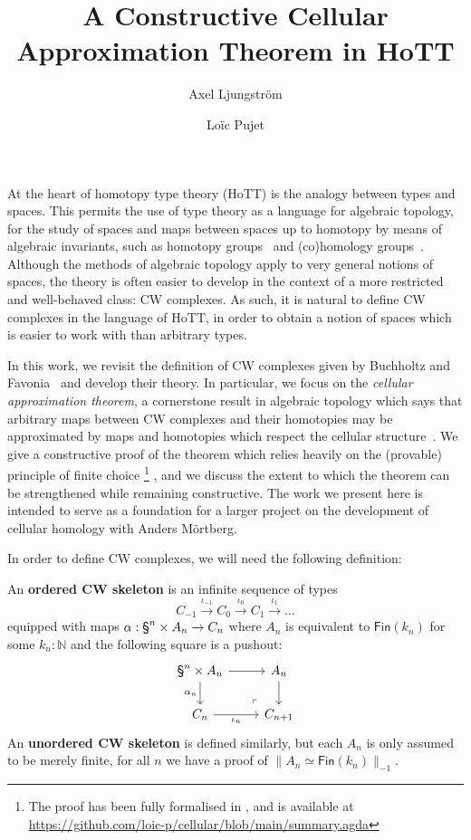 \documentclass{easychair}
\title{A Constructive Cellular Approximation Theorem in HoTT}
\author{
Axel Ljungström \and Loïc Pujet}
\institute{
  {
  Stockholm University,
  Stockholm, Sweden
  }
 }
\begin{document}
\maketitle

At the heart of homotopy type theory (HoTT) is the analogy between types and spaces.
%
This permits the use of type theory as a language for algebraic topology, \ie for the study
of spaces and maps between spaces up to homotopy by means of algebraic invariants, such as homotopy groups~\cite{HoTT13,Brunerie16,Buchholtz2016TheCC} and (co)homology groups~\cite{LicataFinster14,CavalloMsc15,BuchholtzFavonia18,graham18,BLM22,christensen2020hurewicz,LLM23,LM24}.
%
Although the methods of algebraic topology apply to very general notions of spaces, the theory is
often easier to develop in the context of a more restricted and well-behaved class:
CW complexes.
%
As such, it is natural to define CW complexes in the language of HoTT,
in order to obtain a notion of spaces which is easier to work with than arbitrary types.

In this work, we revisit the definition of CW complexes given by Buchholtz and
Favonia~\cite{BuchholtzFavonia18} and develop their theory.
%
In particular, we focus on the \emph{cellular approximation theorem}, a cornerstone result in
algebraic topology which says that arbitrary maps between CW complexes and their homotopies may be
approximated by maps and homotopies which respect the cellular structure~\cite[chap. 10]{May1999}.
%
We give a constructive proof of the theorem which relies heavily on the (provable) principle of
finite choice%
\footnote{The proof has been fully formalised in \CubicalAgda, and is available at \url{https://github.com/loic-p/cellular/blob/main/summary.agda}}%
, and we discuss the extent to which the theorem can be strengthened while remaining constructive.
%
The work we present here is intended to serve as a foundation for a larger
project on the development of cellular homology with Anders Mörtberg.

In order to define CW complexes, we will need the following definition:

\begin{definition}[CW skeleta]
  An \textbf{ordered CW skeleton} is an infinite sequence of types $$C_{-1} \xrightarrow{\iota_{-1}} C_0 \xrightarrow{\iota_{0}} C_1 \xrightarrow{\iota_{1}} \dots$$
  equipped with maps $\alpha : \sphere{n} \times A_n \to C_n$ where $A_n$ is equivalent to $\mathsf{Fin}(k_n)$ for some $k_n : \mathbb{N}$ and the following square is a pushout:
  \[
\begin{tikzcd}[ampersand replacement=\&]
	{\sphere{n} \times A_n} \& {A_n} \\
	{C_n} \& {C_{n+1}}
	\arrow[from=1-1, to=1-2]
	\arrow["{\alpha_n}"', from=1-1, to=2-1]
	\arrow["{\iota_n}"', from=2-1, to=2-2]
	\arrow[from=1-2, to=2-2]
	\arrow["\lrcorner"{anchor=center, pos=0.125, rotate=180}, draw=none, from=2-2, to=1-1]
\end{tikzcd}
\]
An \textbf{unordered CW skeleton} is defined similarly, but each $A_n$ is only assumed to be merely
finite, \ie for all \( n \) we have a proof of \( \| A_n \simeq \mathsf{Fin}(k_n) \|_{-1} \).
\end{definition}
\end{document}
